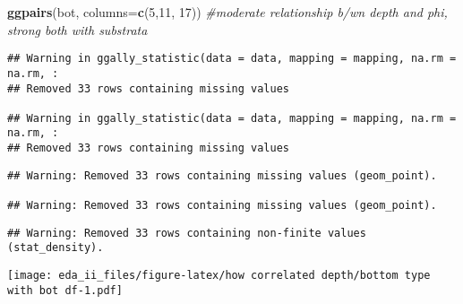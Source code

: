 \documentclass[
]{article}
\newenvironment{Shaded}{\begin{snugshade}}{\end{snugshade}}
\newcommand{\CommentTok}[1]{\textcolor[rgb]{0.56,0.35,0.01}{\textit{#1}}}
\newcommand{\ControlFlowTok}[1]{\textcolor[rgb]{0.13,0.29,0.53}{\textbf{#1}}}
\newcommand{\DataTypeTok}[1]{\textcolor[rgb]{0.13,0.29,0.53}{#1}}
\newcommand{\DecValTok}[1]{\textcolor[rgb]{0.00,0.00,0.81}{#1}}
\newcommand{\KeywordTok}[1]{\textcolor[rgb]{0.13,0.29,0.53}{\textbf{#1}}}
\newcommand{\NormalTok}[1]{#1}
\newcommand{\OperatorTok}[1]{\textcolor[rgb]{0.81,0.36,0.00}{\textbf{#1}}}
\newcommand{\StringTok}[1]{\textcolor[rgb]{0.31,0.60,0.02}{#1}}
\begin{document}
\begin{Shaded}
\begin{Highlighting}[]
\KeywordTok{ggpairs}\NormalTok{(bot, }\DataTypeTok{columns=}\KeywordTok{c}\NormalTok{(}\DecValTok{5}\NormalTok{,}\DecValTok{11}\NormalTok{, }\DecValTok{17}\NormalTok{)) }\CommentTok{#moderate relationship b/wn depth and phi, strong both with substrata}
\end{Highlighting}
\end{Shaded}

\begin{verbatim}
## Warning in ggally_statistic(data = data, mapping = mapping, na.rm = na.rm, :
## Removed 33 rows containing missing values

## Warning in ggally_statistic(data = data, mapping = mapping, na.rm = na.rm, :
## Removed 33 rows containing missing values
\end{verbatim}

\begin{verbatim}
## Warning: Removed 33 rows containing missing values (geom_point).

## Warning: Removed 33 rows containing missing values (geom_point).
\end{verbatim}

\begin{verbatim}
## Warning: Removed 33 rows containing non-finite values (stat_density).
\end{verbatim}

\texttt{[image: eda\_ii\_files/figure-latex/how correlated depth/bottom type with bot df-1.pdf]}

\begin{Shaded}
\end{Shaded}
\end{document}
